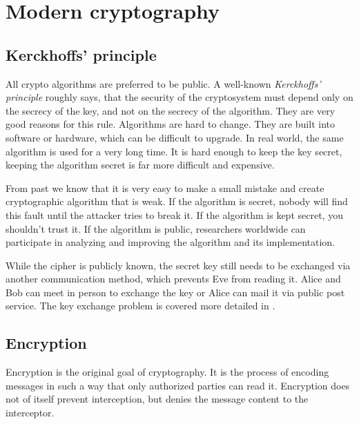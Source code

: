 \chapter{Modern cryptography}

\section{Kerckhoffs' principle}
\label{toc/kerckhoffs-principle}

All crypto algorithms are preferred to be public. A well-known \textit{Kerckhoffs' principle} roughly says, that the security of the cryptosystem must depend only on the secrecy of the key, and not on the secrecy of the algorithm. They are very good reasons for this rule. Algorithms are hard to change. They are built into software or hardware, which can be difficult to upgrade. In real world, the same algorithm is used for a very long time. It is hard enough to keep the key secret, keeping the algorithm secret is far more difficult and expensive.

From past we know that it is very easy to make a small mistake and create cryptographic algorithm that is weak. If the algorithm is secret, nobody will find this fault until the attacker tries to break it. If the algorithm is kept secret, you shouldn't trust it. If the algorithm is public, researchers worldwide can participate in analyzing and improving the algorithm and its implementation.

While the cipher is publicly known, the secret key still needs to be exchanged via another communication method, which prevents Eve from reading it. Alice and Bob can meet in person to exchange the key or Alice can mail it via public post service. The key exchange problem is covered more detailed in .

\section{Encryption}
\label{toc/encryption}




Encryption is the original goal of cryptography. It is the process of encoding messages in such a way that only authorized parties can read it. Encryption does not of itself prevent interception, but denies the message content to the interceptor.

